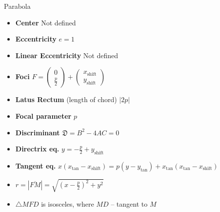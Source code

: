 \documentclass[aspectratio=169]{beamer}
\newcommand{\shf}{\text{shift}}
\begin{document}
\begin{frame}[t]{Parabola}
\begin{multicols}{3}
\begin{itemize}
            \item \textbf{Center} Not defined
            \item \textbf{Eccentricity} $e = 1$
            \item \textbf{Linear Eccentricity} Not defined
            \item \textbf{Foci} $F = \begin{pmatrix} 0\\\frac{p}{2} \end{pmatrix} + \begin{pmatrix} x_{\shf}\\y_{\shf} \end{pmatrix}$
            \item \textbf{Latus Rectum} (length of chord) $|2p|$
            \item \textbf{Focal parameter}  $p$
            \item \textbf{Discriminant} $\mathfrak{D} = B^2 - 4AC = 0$
            \item \textbf{Directrix eq.} $y = -\frac{p}{2} + y_{\shf}$
            \item \textbf{Tangent eq.}  $x(x_{\text{tan}}-x_{\shf})=p(y-y_{\text{tan}})+x_{\text{tan}}(x_{\text{tan}}-x_{\shf})$
            \item $r = |\overline{FM}|=\sqrt{(x-\frac{p}{2})^2+y^2}$
            \item $\triangle MFD$ is isosceles, where $MD$ -- tangent to $M$
            \end{itemize}
    \end{multicols}
    \end{frame}
\end{document}
